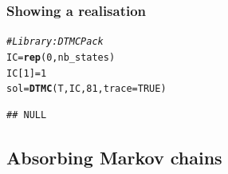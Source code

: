 \documentclass[aspectratio=169]{beamer}\usepackage[]{graphicx}\usepackage[]{xcolor}
\makeatletter
\newcommand{\hlnum}[1]{\textcolor[rgb]{0.686,0.059,0.569}{#1}}%
\newcommand{\hlcom}[1]{\textcolor[rgb]{0.678,0.584,0.686}{\textit{#1}}}%
\newcommand{\hldef}[1]{\textcolor[rgb]{0.345,0.345,0.345}{#1}}%
\newcommand{\hlkwb}[1]{\textcolor[rgb]{0.69,0.353,0.396}{#1}}%
\newcommand{\hlkwc}[1]{\textcolor[rgb]{0.333,0.667,0.333}{#1}}%
\newcommand{\hlkwd}[1]{\textcolor[rgb]{0.737,0.353,0.396}{\textbf{#1}}}%
\newenvironment{kframe}{%
 \def\at@end@of@kframe{}%
 \ifinner\ifhmode%
  \def\at@end@of@kframe{\end{minipage}}%
  \begin{minipage}{\columnwidth}%
 \fi\fi%
 \def\FrameCommand##1{\hskip\@totalleftmargin \hskip-\fboxsep
 \colorbox{shadecolor}{##1}\hskip-\fboxsep
     \hskip-\linewidth \hskip-\@totalleftmargin \hskip\columnwidth}%
 \MakeFramed {\advance\hsize-\width
   \@totalleftmargin\z@ \linewidth\hsize
   \@setminipage}}%
 {\par\unskip\endMakeFramed%
 \at@end@of@kframe}
\newenvironment{knitrout}{}{} %
\makeatother
\begin{document}
\begin{frame}[fragile]\frametitle{Showing a realisation}
\begin{knitrout}
\color{fgcolor}\begin{kframe}
\begin{alltt}
\hlcom{# Library: DTMCPack}
\hldef{IC} \hlkwb{=} \hlkwd{rep}\hldef{(}\hlnum{0}\hldef{, nb_states)}
\hldef{IC[}\hlnum{1}\hldef{]} \hlkwb{=} \hlnum{1}
\hldef{sol} \hlkwb{=} \hlkwd{DTMC}\hldef{(T, IC,} \hlnum{81}\hldef{,} \hlkwc{trace}\hldef{=}\hlnum{TRUE}\hldef{)}
\end{alltt}
\begin{verbatim}
## NULL
\end{verbatim}
\end{kframe}
\end{knitrout}
\end{frame}


\subsection{Absorbing Markov chains}
\end{document}
